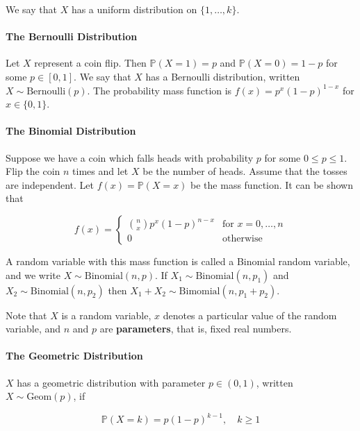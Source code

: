 We say that \(X\) has a uniform distribution on \(\{ 1, \dots, k \}\).

\paragraph{The Bernoulli Distribution}\label{the-bernoulli-distribution}

Let \(X\) represent a coin flip. Then \(\mathbb{P}(X = 1) = p\) and
\(\mathbb{P}(X = 0) = 1 - p\) for some \(p \in [0, 1]\). We say that
\(X\) has a Bernoulli distribution, written
\(X \sim \text{Bernoulli}(p)\). The probability mass function is
\(f(x) = p^x (1 - p)^{1 - x}\) for \(x \in \{ 0, 1 \}\).

\paragraph{The Binomial Distribution}\label{the-binomial-distribution}

Suppose we have a coin which falls heads with probability \(p\) for some
\(0 \leq p \leq 1\). Flip the coin \(n\) times and let \(X\) be the
number of heads. Assume that the tosses are independent. Let
\(f(x) = \mathbb{P}(X = x)\) be the mass function. It can be shown that

\[ f(x) = \begin{cases}
\binom{n}{x} p^x (1 - p)^{n - x} &\text{for } x= 0, \dots, n \\
0 &\text{otherwise}
\end{cases} \]

A random variable with this mass function is called a Binomial random
variable, and we write \(X \sim \text{Binomial}(n, p)\). If
\(X_1 \sim \text{Binomial}(n, p_1)\) and
\(X_2 \sim \text{Binomial}(n, p_2)\) then
\(X_1 + X_2 \sim \text{Bimomial}(n, p_1 + p_2)\).

Note that \(X\) is a random variable, \(x\) denotes a particular value
of the random variable, and \(n\) and \(p\) are \textbf{parameters},
that is, fixed real numbers.

\paragraph{The Geometric Distribution}\label{the-geometric-distribution}

\(X\) has a geometric distribution with parameter \(p \in (0, 1)\),
written \(X \sim \text{Geom}(p)\), if

\[\mathbb{P}(X = k) = p(1 - p)^{k - 1}, \quad k \geq 1\]

